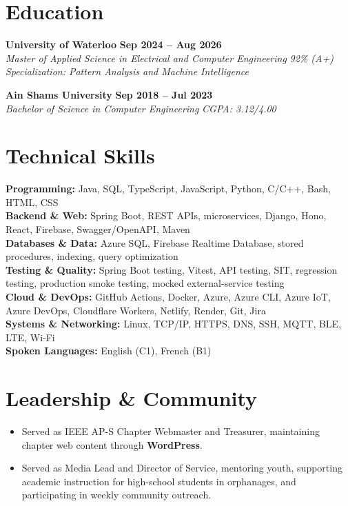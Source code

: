\documentclass[letterpaper,11pt]{article}
\newcommand{\resumeSubheading}[4]{
  \textbf{#1} \hfill \textbf{#2} \\
  \textit{#3} \hfill \textit{#4} \\
}
\begin{document}
\section{Education}

\textbf{University of Waterloo} \hfill \textbf{Sep 2024 -- Aug 2026} \\
\textit{Master of Applied Science in Electrical and Computer Engineering} \hfill \textit{92\% (A+)} \\
\textit{Specialization: Pattern Analysis and Machine Intelligence} \\

\vspace{3pt}

\resumeSubheading
{Ain Shams University}{Sep 2018 -- Jul 2023}
{Bachelor of Science in Computer Engineering}{CGPA: 3.12/4.00}

\section{Technical Skills}

\textbf{Programming:} Java, SQL, TypeScript, JavaScript, Python, C/C++, Bash, HTML, CSS \\
\textbf{Backend \& Web:} Spring Boot, REST APIs, microservices, Django, Hono, React, Firebase, Swagger/OpenAPI, Maven \\
\textbf{Databases \& Data:} Azure SQL, Firebase Realtime Database, stored procedures, indexing, query optimization \\
\textbf{Testing \& Quality:} Spring Boot testing, Vitest, API testing, SIT, regression testing, production smoke testing, mocked external-service testing \\
\textbf{Cloud \& DevOps:} GitHub Actions, Docker, Azure, Azure CLI, Azure IoT, Azure DevOps, Cloudflare Workers, Netlify, Render, Git, Jira \\
\textbf{Systems \& Networking:} Linux, TCP/IP, HTTPS, DNS, SSH, MQTT, BLE, LTE, Wi-Fi \\
\textbf{Spoken Languages:} English (C1), French (B1)

\section{Leadership \& Community}

\begin{itemize}
    \item Served as IEEE AP-S Chapter Webmaster and Treasurer, maintaining chapter web content through \textbf{WordPress}.
    \item Served as Media Lead and Director of Service, mentoring youth, supporting academic instruction for high-school students in orphanages, and participating in weekly community outreach.
\end{itemize}
\end{document}
